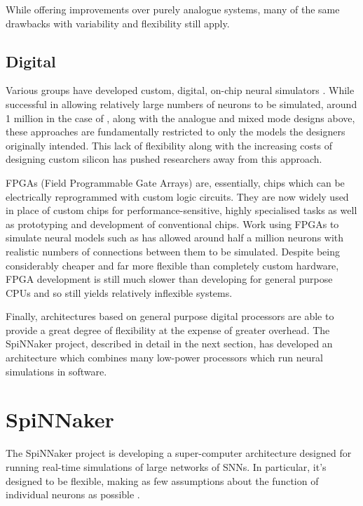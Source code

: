			While offering improvements over purely analogue systems, many of the same
			drawbacks with variability and flexibility still apply.
		
		\subsection{Digital}
			
			Various groups have developed custom, digital, on-chip neural simulators
			\cite{prange93,jahnke96,schoenauer99,mehrtash03}. While successful in
			allowing relatively large numbers of neurons to be simulated, around 1
			million in the case of \cite{mehrtash03}, along with the analogue and mixed
			mode designs above, these approaches are fundamentally restricted to only
			the models the designers originally intended. This lack of flexibility
			along with the increasing costs of designing custom silicon has pushed
			researchers away from this approach.
			
			FPGAs (Field Programmable Gate Arrays) are, essentially, chips which can
			be electrically reprogrammed with custom logic circuits. They are now
			widely used in place of custom chips for performance-sensitive, highly
			specialised tasks as well as prototyping and development of conventional
			chips. Work using FPGAs to simulate neural models such as
			\cite{hellmich05} has allowed around half a million neurons with realistic
			numbers of connections between them to be simulated. Despite being
			considerably cheaper and far more flexible than completely custom
			hardware, FPGA development is still much slower than developing for
			general purpose CPUs and so still yields relatively inflexible systems.
			
			Finally, architectures based on general purpose digital processors are
			able to provide a great degree of flexibility at the expense of greater
			overhead\cite{furber07}. The SpiNNaker project, described in detail in the
			next section, has developed an architecture which combines many low-power
			processors which run neural simulations in software.
	
	
	\section{SpiNNaker}
		
		\label{sec:spinnaker}
		
		
		The SpiNNaker project is developing a super-computer architecture designed
		for running real-time simulations of large networks of SNNs. In particular,
		it's designed to be flexible, making as few assumptions about the
		function of individual neurons as possible \cite{furber06}.
		
